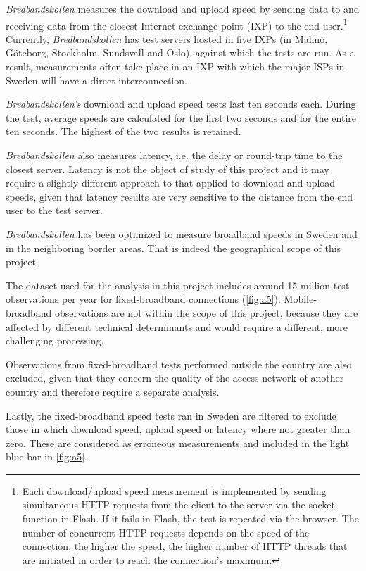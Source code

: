 \documentclass[12pt]{article}
\begin{document}
\textit{Bredbandskollen} measures the download and upload speed by sending data to and receiving data from the closest Internet exchange point (IXP) to the end user.\footnote{
Each download/upload speed measurement is implemented by sending simultaneous HTTP requests from the client to the server via the socket function in Flash. If it fails in Flash, the test is repeated via the browser. The number of concurrent HTTP requests depends on the speed of the connection, the higher the speed, the higher number of HTTP threads that are initiated in order to reach the connection's maximum.} Currently,  \textit{Bredbandskollen} has test servers hosted in five IXPs (in Malmö, Göteborg, Stockholm, Sundsvall and Oslo), against which the tests are run. As a result, measurements often take place in an IXP with which the major ISPs in Sweden will have a direct interconnection. 

\textit{Bredbandskollen's} download and upload speed tests last ten seconds each. During the test, average speeds are calculated for the first two seconds and for the entire ten seconds. The highest of the two results is retained.  

\textit{Bredbandskollen} also measures latency, i.e. the delay or round-trip time to the closest server. Latency is not the object of study of this project and it may require a slightly different approach to that applied to download and upload speeds, given that latency results are very sensitive to the distance from the end user to the test server.     

\textit{Bredbandskollen} has been optimized to measure broadband speeds in Sweden and in the neighboring border areas. That is indeed the geographical scope of this project. 

The dataset used for the analysis in this project includes around 15 million test observations per year for fixed-broadband connections (\autoref{fig:a5}). Mobile-broadband observations are not within the scope of this project, because they are affected by different technical determinants and would require a different, more challenging processing.

Observations from fixed-broadband tests performed outside the country are also excluded, given that they concern the quality of the access network of another country and therefore require a separate analysis. 

Lastly, the fixed-broadband speed tests ran in Sweden are filtered to exclude those in which download speed, upload speed or latency where not greater than zero. These are considered as erroneous measurements and included in the light blue bar in \autoref{fig:a5}.           
\end{document}
